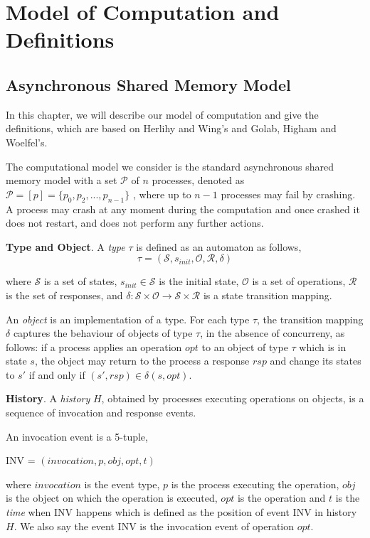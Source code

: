 
\chapter{Model of Computation and Definitions}
\section{Asynchronous Shared Memory Model}
In this chapter, we will describe our model of computation and give the definitions, which are based on Herlihy
and Wing's\cite{Herlihy:1990:LCC:78969.78972} and Golab, Higham and Woelfel's\cite{golab2011linearizable}.

The computational model we consider is the standard asynchronous shared memory model with a set $\mathcal{P}$
of $n$ processes, denoted as $\mathcal{P} = [p] =\{p_0, p_2,...,p_{n-1}\}$ , where up to $n-1$ processes may fail by crashing.
A process may crash at any moment during the computation and once crashed it does not restart,
and does not perform any further actions.

\textbf{Type and Object}.
A \emph{type} $\tau$ is defined as an automaton as follows\cite{InProc-GHHW2007a},
$$\tau = (\mathcal{S}, s_{init},\mathcal{O},\mathcal{R} ,\delta )$$

where $\mathcal{S}$ is a set of states, $s_{init} \in \mathcal{S}$ is the initial state, $\mathcal{O}$ is a set of
operations, $\mathcal{R}$ is the set of responses, and
$\delta :\mathcal{S} \times \mathcal{O} \to \mathcal{S} \times \mathcal{R}$ is a state transition mapping.

An \emph{object} is an implementation of a type. For each type $\tau$, the transition mapping $\delta$ captures the
behaviour of objects of type $\tau$, in the absence of concurreny,
as follows: if a process applies an operation $opt$ to an object of type $\tau$ which is in state $s$, the object
may return to the process a response $rsp$ and change its states to $s'$ if and only if $(s', rsp) \in \delta(s, opt)$.

\textbf{History}.
A \emph{history} $H$, obtained by processes executing
operations on objects, is a sequence of invocation
and response events.

An invocation event is a 5-tuple,
\begin{center}
INV = $(invocation, p, obj, opt, t)$
\end{center}
where $invocation$ is the event type, $p$ is the process executing the operation, $obj$ is the object on which the operation
is executed, $opt$ is the operation and $t$ is the \emph{time} when INV happens which is defined
as the position of event INV in history $H$. We also say the event INV is the invocation event of operation $opt$.

